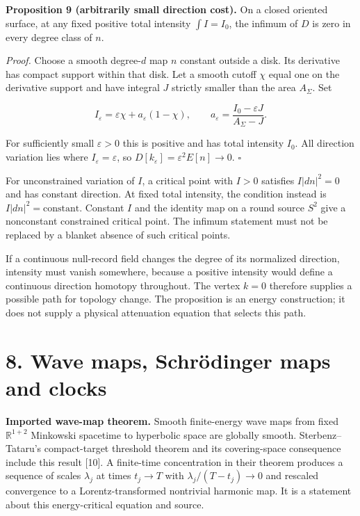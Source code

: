\documentclass[
  11pt,
  a4paper,
]{article}
\begin{document}
\textbf{Proposition 9 (arbitrarily small direction cost).} On a closed oriented surface, at any fixed positive total intensity \(\int I=I_0\), the infimum of \(D\) is zero in every degree class of \(n\).

\emph{Proof.} Choose a smooth degree-\(d\) map \(n\) constant outside a disk. Its derivative has compact support within that disk. Let a smooth cutoff \(\chi\) equal one on the derivative support and have integral \(J\) strictly smaller than the area \(A_\Sigma\). Set

\[
I_\varepsilon=\varepsilon\chi+a_\varepsilon(1-\chi),
\qquad a_\varepsilon=\frac{I_0-\varepsilon J}{A_\Sigma-J}.
\]

For sufficiently small \(\varepsilon>0\) this is positive and has total intensity \(I_0\). All direction variation lies where \(I_\varepsilon=\varepsilon\), so \(D[k_\varepsilon]=\varepsilon^2E[n]\to0\). \(\square\)

For unconstrained variation of \(I\), a critical point with \(I>0\) satisfies \(I|dn|^2=0\) and has constant direction. At fixed total intensity, the condition instead is \(I|dn|^2=\text{constant}\). Constant \(I\) and the identity map on a round source \(S^2\) give a nonconstant constrained critical point. The infimum statement must not be replaced by a blanket absence of such critical points.

If a continuous null-record field changes the degree of its normalized direction, intensity must vanish somewhere, because a positive intensity would define a continuous direction homotopy throughout. The vertex \(k=0\) therefore supplies a possible path for topology change. The proposition is an energy construction; it does not supply a physical attenuation equation that selects this path.

\section{8. Wave maps, Schrödinger maps and clocks}\label{wave-maps-schruxf6dinger-maps-and-clocks}

\textbf{Imported wave-map theorem.} Smooth finite-energy wave maps from fixed \(\mathbb R^{1+2}\) Minkowski spacetime to hyperbolic space are globally smooth. Sterbenz--Tataru's compact-target threshold theorem and its covering-space consequence include this result {[}10{]}. A finite-time concentration in their theorem produces a sequence of scales \(\lambda_j\) at times \(t_j\to T\) with \(\lambda_j/(T-t_j)\to0\) and rescaled convergence to a Lorentz-transformed nontrivial harmonic map. It is a statement about this energy-critical equation and source.
\end{document}
